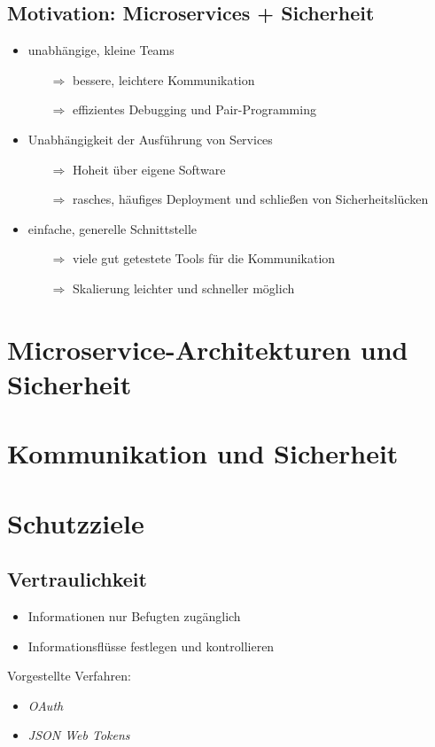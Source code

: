 \documentclass{beamer}
\begin{document}
\subsection{Motivation: Microservices + Sicherheit}
\begin{frame}{\insertsubsection}
	\begin{itemize}
		\item unabhängige, kleine Teams
		\begin{itemize}
			\item[$\Rightarrow$] bessere, leichtere Kommunikation
			\item[$\Rightarrow$] effizientes Debugging und Pair-Programming
		\end{itemize}
		\item Unabhängigkeit der Ausführung von Services
		\begin{itemize}
			\item[$\Rightarrow$] Hoheit über eigene Software
			\item[$\Rightarrow$] rasches, häufiges Deployment und schließen von Sicherheitslücken
		\end{itemize}
		\item einfache, generelle Schnittstelle
		\begin{itemize}
			\item[$\Rightarrow$] viele gut getestete Tools für die Kommunikation
			\item[$\Rightarrow$] Skalierung leichter und schneller möglich
		\end{itemize}
	\end{itemize}
\end{frame}

	
\section{Microservice-Architekturen und Sicherheit}
\section{Kommunikation und Sicherheit}
\section{Schutzziele}

\subsection{Vertraulichkeit}
\begin{frame}{\insertsubsection}
	\begin{itemize}
		\item Informationen nur Befugten zugänglich
		\item Informationsflüsse festlegen und kontrollieren
	\end{itemize}
	\vspace*{1cm}
	\pause
	Vorgestellte Verfahren:
	\begin{itemize}
		\item \textit{OAuth}
		\item \textit{JSON Web Tokens}
	\end{itemize}
\end{frame}
\end{document}
